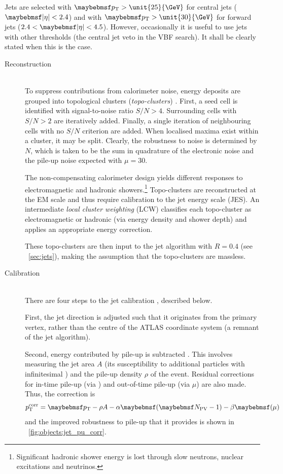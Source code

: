 Jets are selected with $\pt > \unit{25}{\GeV}$ for central jets ($\mods{\eta} < 2.4$) and 
with $\pt > \unit{30}{\GeV}$ for forward jets ($2.4 < \mods{\eta} < 4.5$). However, 
occasionally it is useful to use jets with other \pt thresholds (\eg the central jet 
veto in the VBF search). It shall be clearly stated when this is the case.

\begin{description}
\item[Reconstruction] \hfill \\
	To suppress contributions from calorimeter noise, energy deposits are grouped into 
	topological clusters (\textit{topo-clusters}) \cite{Jets:Calib:2010,Jets:Calib:2011}. 
	First, a seed cell is identified with signal-to-noise ratio $S/N > 4$. Surrounding 
	cells with $S/N > 2$ are iteratively added. Finally, a single iteration of 
	neighbouring cells with no $S/N$ criterion are added. When localised maxima exist within 
	a cluster, it may be split. Clearly, the robustness to noise is determined by $N$, 
	which is taken to be the sum in quadrature of the electronic noise and the pile-up 
	noise expected with $\mu = 30$.

	The non-compensating calorimeter design yields different responses to electromagnetic 
	and hadronic showers.\footnote{
		Significant hadronic shower energy is lost through slow neutrons, nuclear 
		excitations and neutrinos.
	}
	Topo-clusters are reconstructed at the EM scale and thus require calibration to the 
	jet energy scale (JES). An intermediate \textit{local cluster weighting} (LCW) 
	classifies each topo-cluster as electromagnetic or hadronic (via energy density and 
	shower depth) and applies an appropriate energy correction.
	
	These topo-clusters are then input to the \antikt jet algorithm with $R = 0.4$ (see 
	\Section~\ref{sec:jets}), making the assumption that the topo-clusters are massless.

\item[Calibration] \hfill \\
	There are four steps to the jet calibration \cite{Jets:Calib:2011}, described below.

	First, the jet direction is adjusted such that it originates from the primary vertex, 
	rather than the centre of the ATLAS coordinate system (a remnant of the jet 
	algorithm).

	Second, energy contributed by pile-up is subtracted \cite{Jets:PileupCorrection:2012}.
	This involves measuring the jet area $A$ (its susceptibility to additional particles 
	with infinitesimal \pt) and the pile-up density $\rho$ of the event. Residual 
	corrections for in-time pile-up (via \npv) and out-of-time pile-up (via $\mu$) are 
	also made. Thus, the correction is
	\begin{equation}
		p_{\text{T}}^{\text{corr}} = \pt - \rho A - \alpha \parenths{\npv - 1} 
		- \beta \parenths{\mu}
	\end{equation}
	and the improved robustness to pile-up that it provides is shown in 
	\Figure~\ref{fig:objects:jet_pu_corr}.


\end{description}
